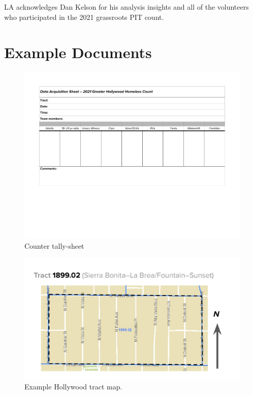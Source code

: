 \documentclass[11pt,twocolumn]{article}
\def\Count{count}
\begin{document}
\section*{}

LA acknowledges Dan Kelson for his analysis insights and all of the volunteers who participated
in the 2021 grassroots PIT \Count.

\appendix

\section{Example Documents}

\begin{figure}
	\centering
	\includegraphics[width =\linewidth]{Hollywood2021CountDataSheet}
	\caption{Counter tally-sheet}
\end{figure}

\begin{figure}
	\centering
	\includegraphics[width =\linewidth]{tractMap}
	\caption{Example Hollywood tract map.}
\end{figure}
\end{document}
